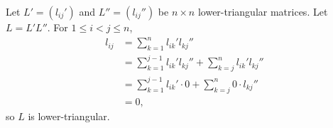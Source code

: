 Let $L'=(l_{ij}')$ and $L''=(l_{ij}'')$ be $n\times n$ lower-triangular matrices.
Let $L=L'L''$.
For $1\le i<j\le n$,
\begin{align*}
    l_{ij} &= \sum_{k=1}^nl_{ik}'l_{kj}'' \\
    &= \sum_{k=1}^{j-1}l_{ik}'l_{kj}''+\sum_{k=j}^nl_{ik}'l_{kj}'' \\
    &= \sum_{k=1}^{j-1}l_{ik}'\cdot0+\sum_{k=j}^n0\cdot l_{kj}'' \\
    &= 0,
\end{align*}
so $L$ is lower-triangular.
